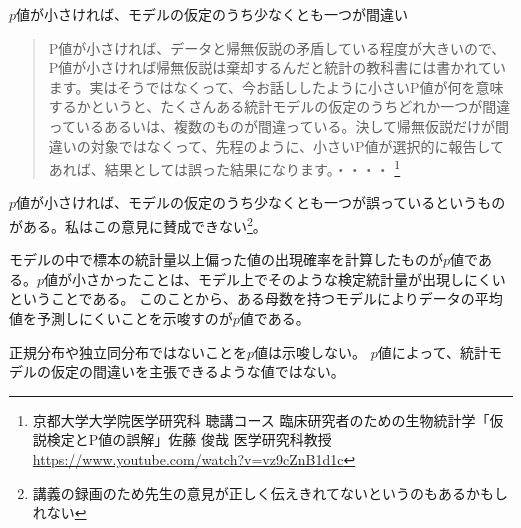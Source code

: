 



\begin{SMbox}{$p$値が小さければ、モデルの仮定のうち少なくとも一つが間違い}
    \begin{quote}
        P値が小さければ、データと帰無仮説の矛盾している程度が大きいので、P値が小さければ帰無仮説は棄却するんだと統計の教科書には書かれています。実はそうではなくって、今お話ししたように小さいP値が何を意味するかというと、たくさんある統計モデルの仮定のうちどれか一つが間違っているあるいは、複数のものが間違っている。決して帰無仮説だけが間違いの対象ではなくって、先程のように、小さいP値が選択的に報告してあれば、結果としては誤った結果になります。・・・・
        \footnote{京都大学大学院医学研究科 聴講コース 臨床研究者のための生物統計学「仮説検定とP値の誤解」佐藤 俊哉 医学研究科教授 \url{https://www.youtube.com/watch?v=vz9cZnB1d1c} }
    \end{quote}
    $p$値が小さければ、モデルの仮定のうち少なくとも一つが誤っているというものがある。私はこの意見に賛成できない\footnote{講義の録画のため先生の意見が正しく伝えきれてないというのもあるかもしれない}。

    モデルの中で標本の統計量以上偏った値の出現確率を計算したものが$p$値である。$p$値が小さかったことは、モデル上でそのような検定統計量が出現しにくいということである。
    このことから、ある母数を持つモデルによりデータの平均値を予測しにくいことを示唆すのが$p$値である。

    正規分布や独立同分布ではないことを$p$値は示唆しない。
 $p$値によって、統計モデルの仮定の間違いを主張できるような値ではない。

\end{SMbox}


